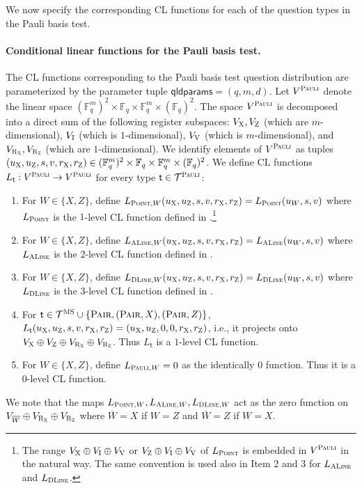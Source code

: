 \documentclass[11pt]{article}
\theoremstyle{definition}
\newcommand{\F}{\ensuremath{\mathbb{F}}}
\newcommand{\type}{\mathcal{T}}
\newcommand{\gamestyle}[1]{\ensuremath{\textsc{#1}}\xspace}
\newcommand{\ms}{\gamestyle{MS}}
\newcommand{\pauli}{\gamestyle{Pauli}}
\newcommand{\labelstyle}[1]{\ensuremath{\textsc{#1}}\xspace}
\newcommand{\xpt}{\labelstyle{X}}
\newcommand{\zpt}{\labelstyle{Z}}
\newcommand{\rxpt}{\labelstyle{R}_\xpt}
\newcommand{\rzpt}{\labelstyle{R}_\zpt}
\newcommand{\dir}[1]{\labelstyle{V#1}}
\newcommand{\coord}{\labelstyle{I}}
\newcommand{\tvarstyle}[1]{\mathsf{#1}}
\newcommand{\tvar}{\ensuremath{\tvarstyle{t}}}
\newcommand{\typestyle}[1]{\ensuremath{\textsc{#1}}\xspace}
\newcommand{\Point}{\typestyle{Point}}
\newcommand{\ALine}{\typestyle{ALine}}
\newcommand{\DLine}{\typestyle{DLine}}
\newcommand{\Pair}{\typestyle{Pair}}
\newcommand{\Pauli}{\typestyle{Pauli}}
\newcommand{\qldparams}{\mathsf{qldparams}}
\begin{document}
We now specify the corresponding CL functions for each of the question types in
the Pauli basis test.

\paragraph{Conditional linear functions for the Pauli basis test.}
The CL functions corresponding to the Pauli basis test question distribution are
parameterized by the parameter tuple $\qldparams = (q,m,d)$.
Let $V^\pauli$ denote the linear space $(\F_q^m)^2 \times \F_q \times \F_q^m
\times (\F_q)^2$.
The space $V^\pauli$ is decomposed into a direct sum of the following register
subspaces: $V_\xpt,V_\zpt$ (which are $m$-dimensional), $V_\coord$ (which is
$1$-dimensional), $V_{\dir{}}$ (which is $m$-dimensional), and
$V_{\rxpt},V_{\rzpt}$ (which are $1$-dimensional).
We identify elements of $V^\pauli$ as tuples $(u_\xpt,u_\zpt,s,v,r_\xpt,r_\zpt)
\in (\F_q^m)^2 \times \F_q \times \F_q^m \times (\F_q)^2$.
We define CL functions $L_\tvar: V^\pauli \to V^\pauli$ for every type $\tvar
\in \type^\pauli$:
\begin{enumerate}
\item For $W \in \{X,Z\}$, define $L_{\Point,W}(u_\xpt,u_\zpt,s,v,r_\xpt,r_\zpt)
  = L_\Point(u_W,s,v)$ where $L_\Point$ is the $1$-level CL function defined in
  .\footnote{The range $V_{\xpt} \oplus V_\coord \oplus
    V_{\dir{}}$ or $V_{\zpt} \oplus V_\coord \oplus V_{\dir{}}$ of $L_\Point$ is
    embedded in $V^\pauli$ in the natural way.
    The same convention is used also in Item 2 and 3 for $L_\ALine$ and
    $L_\DLine$.}
\item For $W \in \{X,Z\}$, define $L_{\ALine,W}(u_\xpt,u_\zpt,s,v,r_\xpt,r_\zpt)
  = L_\ALine(u_W,s,v)$ where $L_\ALine$ is the $2$-level CL function defined in
  .
\item For $W \in \{X,Z\}$, define $L_{\DLine,W}(u_\xpt,u_\zpt,s,v,r_\xpt,r_\zpt)
  = L_\DLine(u_W,s,v)$ where $L_\DLine$ is the $3$-level CL function defined in
  .
\item For $\tvar \in \type^\ms \cup \{\Pair, (\Pair,X), (\Pair,Z) \}$,
  $L_{\tvar}(u_\xpt,u_\zpt,s,v,r_\xpt,r_\zpt) =
  (u_\xpt,u_\zpt,0,0,r_\xpt,r_\zpt)$, i.e., it projects onto $V_\xpt \oplus
  V_\zpt \oplus V_{\rxpt} \oplus V_{\rzpt}$.
  Thus $L_{\tvar}$ is a $1$-level CL function.
  
\item For $W \in \{X,Z\}$, define $L_{\Pauli,W} = 0$ as the identically $0$
  function.
  Thus it is a $0$-level CL function.

\end{enumerate}
We note that the maps $L_{\Point,W}, L_{\ALine,W}, L_{\DLine,W}$ act as the zero function
on $V_{\overline{W}} \oplus V_{\rxpt} \oplus V_{\rzpt}$ where $\overline{W} = X$
if $W = Z$ and $\overline{W} = Z$ if $W = X$.
\end{document}
